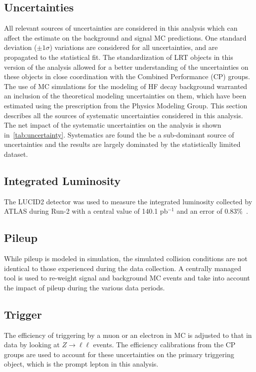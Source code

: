 \subsection{Uncertainties}
All relevant sources of uncertainties are considered in this analysis which can affect the estimate on the background and signal MC predictions. One standard deviation ($\pm 1 \sigma$) variations are considered for all uncertainties, and are propagated to the statistical fit. The standardization of LRT objects in this version of the analysis allowed for a better understanding of the uncertainties on these objects in close coordination with the Combined Performance (CP) groups. The use of MC simulations for the modeling of HF decay background warranted an inclusion of the theoretical modeling uncertainties on them, which have been estimated using the prescription from the Physics Modeling Group. This section describes all the sources of systematic uncertainties considered in this analysis. The net impact of the systematic uncertainties on the analysis is shown in~\cref{tab:uncertainty}. Systematics are found the be a sub-dominant source of uncertainties and the results are largely dominated by the statistically limited dataset.

\subsection*{Integrated Luminosity}
The LUCID2 detector was used to measure the integrated luminosity collected by ATLAS during Run-2 with a central value of 140.1 pb$^{-1}$ and an error of 0.83\%~\cite{DAPR-2021-01}.

\subsection*{Pileup}
While pileup is modeled in simulation, the simulated collision conditions are not identical to those experienced during the data collection. A centrally managed tool is used to re-weight signal and background MC events and take into account the impact of pileup during the various data periods.

\subsection*{Trigger}
The efficiency of triggering by a muon or an electron in MC is adjusted to that in data by looking at $Z\to\ell\ell$ events. The efficiency calibrations from the CP groups are used to account for these uncertainties on the primary triggering object, which is the prompt lepton in this analysis.

